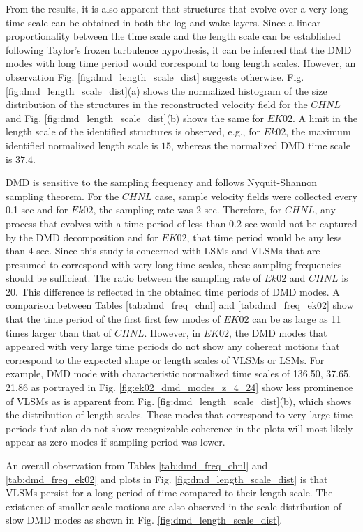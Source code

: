 From the results, it is also apparent that structures that evolve over a very long time scale can be obtained in both the log and wake layers. Since a linear proportionality between the time scale and the length scale can be established following Taylor's frozen turbulence hypothesis, it can be inferred that the DMD modes with long time period would correspond to long length scales. However, an observation Fig. \ref{fig:dmd_length_scale_dist} suggests otherwise. Fig. \ref{fig:dmd_length_scale_dist}(a) shows the normalized histogram of the size distribution of the structures in the reconstructed velocity field for the $CHNL$ and Fig. \ref{fig:dmd_length_scale_dist}(b) shows the same for $EK02$. A limit in the length scale of the identified structures is observed, e.g., for $Ek02$, the maximum identified normalized length scale is $15$, whereas the normalized DMD time scale is $37.4$. 

DMD is sensitive to the sampling frequency and follows Nyquit-Shannon sampling theorem. For the $CHNL$ case, sample velocity fields were collected every 0.1 sec and for $Ek02$, the sampling rate was 2 sec. Therefore, for $CHNL$, any process that evolves with a time period of less than 0.2 sec would not be captured by the DMD decomposition and for $EK02$, that time period would be any less than 4 sec. Since this study is concerned with LSMs and VLSMs that are presumed to correspond with very long time scales, these sampling frequencies should be sufficient. The ratio between the sampling rate of $Ek02$ and $CHNL$ is 20. This difference is reflected in the obtained time periods of DMD modes. A comparison between Tables \ref{tab:dmd_freq_chnl} and \ref{tab:dmd_freq_ek02} show that the time period of the first first few modes of $EK02$ can be as large as 11 times larger than that of $CHNL$. However, in $EK02$, the DMD modes that appeared with very large time periods do not show any coherent motions that correspond to the expected shape or length scales of VLSMs or LSMs. For example, DMD mode with characteristic normalized time scales of 136.50, 37.65, 21.86 as portrayed in Fig.  \ref{fig:ek02_dmd_modes_z_4_24} show less prominence of VLSMs as is apparent from Fig.  \ref{fig:dmd_length_scale_dist}(b), which shows the distribution of length scales. These modes that correspond to very large time periods that also do not show recognizable coherence in the plots will most likely appear as zero modes if sampling period was lower. 

An overall observation from Tables \ref{tab:dmd_freq_chnl} and \ref{tab:dmd_freq_ek02} and plots in Fig. \ref{fig:dmd_length_scale_dist} is that VLSMs persist for a long period of time compared to their length scale. The existence of smaller scale motions are also observed in the scale distribution of slow DMD modes as shown in Fig. \ref{fig:dmd_length_scale_dist}. 

